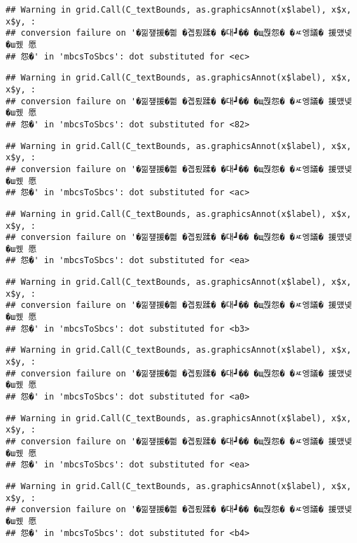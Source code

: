 \documentclass[
]{article}
\begin{document}
\begin{verbatim}
## Warning in grid.Call(C_textBounds, as.graphicsAnnot(x$label), x$x, x$y, :
## conversion failure on '�낆쟾援�쁾 �곕룄蹂� �대┛�� �щ쭩怨� �ㅼ엥議� 援먰넻�ш퀬 愿
## 怨�' in 'mbcsToSbcs': dot substituted for <ec>
\end{verbatim}

\begin{verbatim}
## Warning in grid.Call(C_textBounds, as.graphicsAnnot(x$label), x$x, x$y, :
## conversion failure on '�낆쟾援�쁾 �곕룄蹂� �대┛�� �щ쭩怨� �ㅼ엥議� 援먰넻�ш퀬 愿
## 怨�' in 'mbcsToSbcs': dot substituted for <82>
\end{verbatim}

\begin{verbatim}
## Warning in grid.Call(C_textBounds, as.graphicsAnnot(x$label), x$x, x$y, :
## conversion failure on '�낆쟾援�쁾 �곕룄蹂� �대┛�� �щ쭩怨� �ㅼ엥議� 援먰넻�ш퀬 愿
## 怨�' in 'mbcsToSbcs': dot substituted for <ac>
\end{verbatim}

\begin{verbatim}
## Warning in grid.Call(C_textBounds, as.graphicsAnnot(x$label), x$x, x$y, :
## conversion failure on '�낆쟾援�쁾 �곕룄蹂� �대┛�� �щ쭩怨� �ㅼ엥議� 援먰넻�ш퀬 愿
## 怨�' in 'mbcsToSbcs': dot substituted for <ea>
\end{verbatim}

\begin{verbatim}
## Warning in grid.Call(C_textBounds, as.graphicsAnnot(x$label), x$x, x$y, :
## conversion failure on '�낆쟾援�쁾 �곕룄蹂� �대┛�� �щ쭩怨� �ㅼ엥議� 援먰넻�ш퀬 愿
## 怨�' in 'mbcsToSbcs': dot substituted for <b3>
\end{verbatim}

\begin{verbatim}
## Warning in grid.Call(C_textBounds, as.graphicsAnnot(x$label), x$x, x$y, :
## conversion failure on '�낆쟾援�쁾 �곕룄蹂� �대┛�� �щ쭩怨� �ㅼ엥議� 援먰넻�ш퀬 愿
## 怨�' in 'mbcsToSbcs': dot substituted for <a0>
\end{verbatim}

\begin{verbatim}
## Warning in grid.Call(C_textBounds, as.graphicsAnnot(x$label), x$x, x$y, :
## conversion failure on '�낆쟾援�쁾 �곕룄蹂� �대┛�� �щ쭩怨� �ㅼ엥議� 援먰넻�ш퀬 愿
## 怨�' in 'mbcsToSbcs': dot substituted for <ea>
\end{verbatim}

\begin{verbatim}
## Warning in grid.Call(C_textBounds, as.graphicsAnnot(x$label), x$x, x$y, :
## conversion failure on '�낆쟾援�쁾 �곕룄蹂� �대┛�� �щ쭩怨� �ㅼ엥議� 援먰넻�ш퀬 愿
## 怨�' in 'mbcsToSbcs': dot substituted for <b4>
\end{verbatim}
\end{document}
